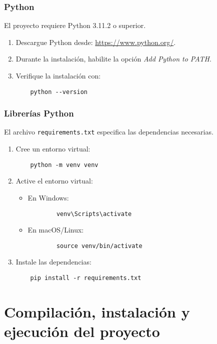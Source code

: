 \subsubsection{Python}
El proyecto requiere Python 3.11.2 o superior.

\begin{enumerate}
    \item Descargue Python desde: \url{https://www.python.org/}.
    \item Durante la instalación, habilite la opción \textit{Add Python to PATH}.
    \item Verifique la instalación con:
    \begin{verbatim}
    python --version
    \end{verbatim}
\end{enumerate}

\subsubsection{Librerías Python}
El archivo \texttt{requirements.txt} especifica las dependencias necesarias.

\begin{enumerate}
    \item Cree un entorno virtual:
    \begin{verbatim}
    python -m venv venv
    \end{verbatim}
    \item Active el entorno virtual:
    \begin{itemize}
        \item En Windows:
        \begin{verbatim}
        venv\Scripts\activate
        \end{verbatim}
        \item En macOS/Linux:
        \begin{verbatim}
        source venv/bin/activate
        \end{verbatim}
    \end{itemize}
    \item Instale las dependencias:
    \begin{verbatim}
    pip install -r requirements.txt
    \end{verbatim}
\end{enumerate}

\section{Compilación, instalación y ejecución del proyecto}

